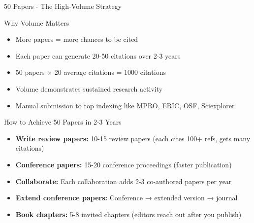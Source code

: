 \documentclass[11pt]{beamer}
\begin{document}
	\begin{frame}{50 Papers - The High-Volume Strategy}
		\scriptsize
		\begin{block}{Why Volume Matters}
			\begin{itemize}
				\item More papers = more chances to be cited
				\item Each paper can generate 20-50 citations over 2-3 years
				\item 50 papers × 20 average citations = 1000 citations
				\item Volume demonstrates sustained research activity
				\item Manual submission to top indexing like MPRO, ERIC, OSF, Sciexplorer
			\end{itemize}
		\end{block}
		\begin{block}{How to Achieve 50 Papers in 2-3 Years}
			\begin{itemize}
				\item \textbf{Write review papers:} 10-15 review papers (each cites 100+ refs, gets many citations)
				\item \textbf{Conference papers:} 15-20 conference proceedings (faster publication)
				\item \textbf{Collaborate:} Each collaboration adds 2-3 co-authored papers per year
				\item \textbf{Extend conference papers:} Conference → extended version → journal
				\item \textbf{Book chapters:} 5-8 invited chapters (editors reach out after you publish)
			\end{itemize}
		\end{block}
	\end{frame}
	
\end{document}
